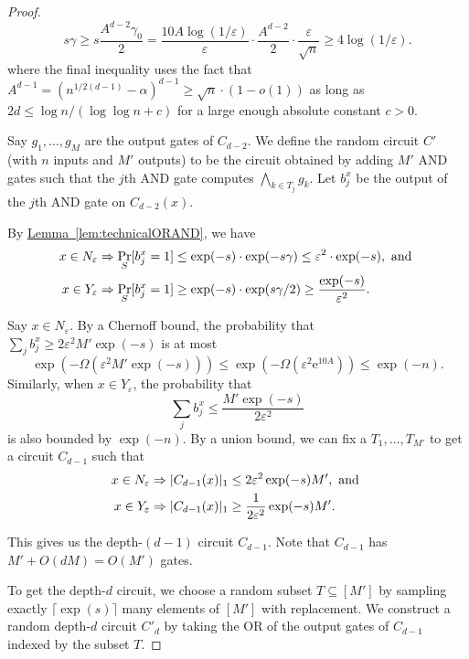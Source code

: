 \documentclass[11pt]{article}
\numberwithin{equation}{section}
\theoremstyle{definition}
\theoremstyle{plain}
\newcommand{\eee}{\mathrm e}
\newcommand{\expref}[2]{\hyperref[#2]{#1~\ref{#2}}}
\newcommand{\prob}[2]{\mathop{\mathrm{Pr}}_{#1}[#2]}
\begin{document}
\begin{proof}
\[
s\gamma \geq s\frac{A^{d-2}\gamma_0}{2}= \frac{10A\log(1/\varepsilon)}{\varepsilon}\cdot \frac{A^{d-2}}{2}\cdot \frac{\varepsilon}{\sqrt{n}}\geq 4\log(1/\varepsilon).
\]
where the final inequality uses the fact that $A^{d-1}= (n^{1/2(d-1)}-\alpha)^{d-1} \geq \sqrt{n}\cdot(1-o(1))$ as long as $2d\leq \log n/(\log \log n + c)$ for a large enough absolute constant $c > 0$.

Say $g_1,\ldots,g_M$ are the output gates of $C_{d-2}$. We define the random circuit $C'$ (with $n$ inputs and $M'$ outputs) to be the circuit obtained by adding $M'$ AND gates such that the $j$th AND gate computes $\bigwedge_{k\in T_j}g_k$. Let $b_j^x$ be the output of the $j$th AND gate on $C_{d-2}(x)$.

By \expref{Lemma}{lem:technicalORAND}, we have
\begin{align}
x\in N_\varepsilon &\Rightarrow \prob{S}{b_j^x = 1} \leq \exp(-s)\cdot \exp(-s\gamma)\leq \varepsilon^2\cdot\exp(-s), \text{ and } \notag \\
x\in Y_\varepsilon &\Rightarrow \prob{S}{b_j^x = 1} \geq \exp(-s)\cdot\exp(s\gamma/2)\geq \frac{\exp(-s)}{\varepsilon^2}. \label{eq:Ctop.1}
\end{align}

Say $x\in N_\varepsilon$. By a Chernoff bound, the probability that $\sum_{j}b_j^x \geq 2\varepsilon^2 M'\exp(-s)$ is at most
\[
  \exp(-\Omega(\varepsilon^2 M'\exp(-s))) \leq \exp(-\Omega(\varepsilon^2 \eee^{10A}))\leq \exp(-n).
\]
Similarly, when $x\in Y_\varepsilon$, the probability that
\[
  \sum_{j}b_j^x \leq\frac{M'\exp(-s)}{2\varepsilon^2}
\]
is also bounded by $\exp(-n)$. By a union bound, we can fix a
$T_1,\ldots,T_{M'}$ to get a circuit $C_{d-1}$ such that
\begin{align}
x\in N_\varepsilon &\Rightarrow |C_{d-1}(x)|_1 \leq 2\varepsilon^2 \exp(-s)M', \text{ and } \notag \\
x\in Y_\varepsilon &\Rightarrow |C_{d-1}(x)|_1 \geq \frac{1}{2\varepsilon^2} \exp(-s)M'. \label{eq:Ctop.2}
\end{align}

This gives us the depth-$(d-1)$ circuit $C_{d-1}$. Note that $C_{d-1}$ has $M' + O(dM) = O(M')$ gates.

To get the depth-$d$ circuit, we choose a random subset $T\subseteq [M']$ by sampling exactly $\lceil\exp(s)\rceil$  many elements of $[M']$ with replacement. We construct a random depth-$d$ circuit $C'_d$ by taking the OR of the output gates of $C_{d-1}$ indexed by the subset $T$. 


\end{proof}
\end{document}
